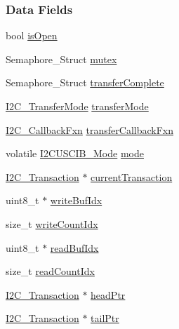 \subsubsection*{Data Fields}
\begin{DoxyCompactItemize}
\item 
bool \hyperlink{struct_i2_c_u_s_c_i_b___object_afeb44b52b987f4c80b89c6a1378c2eba}{is\+Open}
\item 
Semaphore\+\_\+\+Struct \hyperlink{struct_i2_c_u_s_c_i_b___object_a9450acaa87fe47f8397af7ce27bdc035}{mutex}
\item 
Semaphore\+\_\+\+Struct \hyperlink{struct_i2_c_u_s_c_i_b___object_a56e536e46f1ec628a3e29c7840b1222d}{transfer\+Complete}
\item 
\hyperlink{_i2_c_8h_a39f3b9340fc4ee241b0d2da9b2841c26}{I2\+C\+\_\+\+Transfer\+Mode} \hyperlink{struct_i2_c_u_s_c_i_b___object_ab390f22549ab4e5c58c45b44d0a80ee5}{transfer\+Mode}
\item 
\hyperlink{_i2_c_8h_aa7389002843eba77425c73b441358fd1}{I2\+C\+\_\+\+Callback\+Fxn} \hyperlink{struct_i2_c_u_s_c_i_b___object_a7872c208c44ff74d3236ed461bb34645}{transfer\+Callback\+Fxn}
\item 
volatile \hyperlink{_i2_c_u_s_c_i_b_8h_ad7062f0359995b8833bcc3ca097bc8b1}{I2\+C\+U\+S\+C\+I\+B\+\_\+\+Mode} \hyperlink{struct_i2_c_u_s_c_i_b___object_a057600c836395f9e1bc3014b0848e744}{mode}
\item 
\hyperlink{struct_i2_c___transaction}{I2\+C\+\_\+\+Transaction} $\ast$ \hyperlink{struct_i2_c_u_s_c_i_b___object_ae84259e66b519c7957a0fea24a911319}{current\+Transaction}
\item 
uint8\+\_\+t $\ast$ \hyperlink{struct_i2_c_u_s_c_i_b___object_a7d490cd7e12fb848419136df434335c9}{write\+Buf\+Idx}
\item 
size\+\_\+t \hyperlink{struct_i2_c_u_s_c_i_b___object_aaa9a959f9853f9fbd4d055a349baa9c7}{write\+Count\+Idx}
\item 
uint8\+\_\+t $\ast$ \hyperlink{struct_i2_c_u_s_c_i_b___object_aa7772fe14627264dde985b236887645e}{read\+Buf\+Idx}
\item 
size\+\_\+t \hyperlink{struct_i2_c_u_s_c_i_b___object_a309d7d2e3b085bca2dd25bbec4e5971b}{read\+Count\+Idx}
\item 
\hyperlink{struct_i2_c___transaction}{I2\+C\+\_\+\+Transaction} $\ast$ \hyperlink{struct_i2_c_u_s_c_i_b___object_a170a701f539bd2277fbe1e0baa9ba2ea}{head\+Ptr}
\item 
\hyperlink{struct_i2_c___transaction}{I2\+C\+\_\+\+Transaction} $\ast$ \hyperlink{struct_i2_c_u_s_c_i_b___object_a950f31fac4375f5e790d5844ae192872}{tail\+Ptr}
\end{DoxyCompactItemize}


